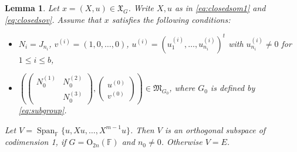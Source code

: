 \documentclass[12pt]{amsart}
\newtheorem{lm}{Lemma}[section]
\theoremstyle{definition}
\theoremstyle{remark}\newtheorem{rmk}[lm]{Remark}
\newcommand{\RO}{{\mathrm {O}}}
\newcommand{\Span}{\operatorname{Span}}
\newcommand{\fM}{\mathfrak M}
\newcommand{\fX}{\mathfrak X}
\newcommand{\C}{\mathbb{F}}
\begin{document}
	\begin{lm}
		\label{lm:closedorbitmaximalso}
		Let $x=(X,u)\in\fX_G$. Write $X,u$ as in \eqref{eq:closedsom1} and \eqref{eq:closedsov}. Assume that $x$ satisfies the following conditions:
        \begin{itemize}
            \item $N_i=J_{n_i}$, $v^{(i)}=(1,0,\dots,0)$, $u^{(i)}=(u_1^{(i)},\dots,u_{n_i}^{(i)})^t$ with $u_{n_i}^{(i)}\neq 0$ for $1\leq i\leq b$,
            \item $\left(\left(\begin{matrix}
				N_0^{(1)}&N_0^{(2)}\\&N_0^{(3)}
			\end{matrix}\right),\left(\begin{matrix}
			    u^{(0)}\\v^{(0)}
			\end{matrix}\right)\right)\in\fM_{G_0}$, where $G_0$ is defined by \eqref{eq:subgroup}.
        \end{itemize}
		Let $V=\Span_{\C}\{u,Xu,\dots,X^{m-1}u\}$. Then $V$ is an orthogonal subspace of codimension 1, if $G=\RO_{2n}(\C)$ and $n_0\neq 0$. Otherwise $V=E$.
	\end{lm}
\end{document}
